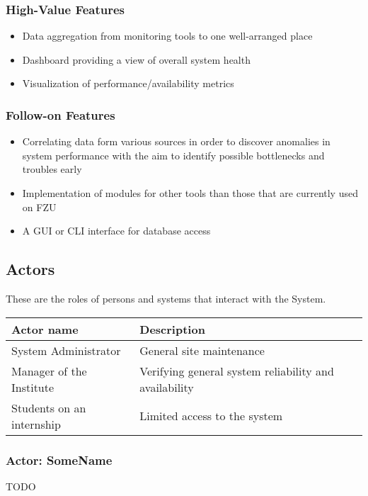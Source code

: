 \documentclass[12pt]{article}
\begin{document}
\subsubsection{High-Value Features}
\begin{itemize}
	\item Data aggregation from monitoring tools to one well-arranged place
    \item Dashboard providing a view of overall system health
    \item Visualization of performance/availability metrics
\end{itemize}

\subsubsection{Follow-on Features}
\begin{itemize}
    \item Correlating data form various sources in order to discover anomalies
        in system performance with the aim to identify possible bottlenecks and
        troubles early
	\item Implementation of modules for other tools than those that are currently used on FZU
    \item A GUI or CLI interface for database access
\end{itemize}

\subsection{Actors}
These are the roles of persons and systems that interact with the System.

\begin{table}[!h]
	\begin{tabular}{| l | l |}
		\hline
		\textbf{Actor name}		& \textbf{Description}\\
		\hline
		System Administrator	& General site maintenance\\
		\hline
		Manager of the Institute	& Verifying general system reliability and
        availability\\
		\hline
		Students on an internship	& Limited access to the system\\
		\hline
	\end{tabular}
	\label{tab:Actors}
\end{table}

\subsubsection{Actor: SomeName}
TODO
\end{document}
